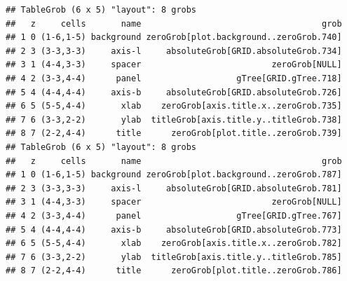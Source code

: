\documentclass[a4paper,landscape]{article}\usepackage[]{graphicx}\usepackage[]{color}
\makeatletter
\newenvironment{kframe}{%
 \def\at@end@of@kframe{}%
 \ifinner\ifhmode%
  \def\at@end@of@kframe{\end{minipage}}%
  \begin{minipage}{\columnwidth}%
 \fi\fi%
 \def\FrameCommand##1{\hskip\@totalleftmargin \hskip-\fboxsep
 \colorbox{shadecolor}{##1}\hskip-\fboxsep
     \hskip-\linewidth \hskip-\@totalleftmargin \hskip\columnwidth}%
 \MakeFramed {\advance\hsize-\width
   \@totalleftmargin\z@ \linewidth\hsize
   \@setminipage}}%
 {\par\unskip\endMakeFramed%
 \at@end@of@kframe}
\newenvironment{knitrout}{}{} %
\makeatother
\begin{document}
\begin{knitrout}
\color{fgcolor}\begin{kframe}
\begin{verbatim}
## TableGrob (6 x 5) "layout": 8 grobs
##   z     cells       name                                    grob
## 1 0 (1-6,1-5) background zeroGrob[plot.background..zeroGrob.740]
## 2 3 (3-3,3-3)     axis-l     absoluteGrob[GRID.absoluteGrob.734]
## 3 1 (4-4,3-3)     spacer                          zeroGrob[NULL]
## 4 2 (3-3,4-4)      panel                   gTree[GRID.gTree.718]
## 5 4 (4-4,4-4)     axis-b     absoluteGrob[GRID.absoluteGrob.726]
## 6 5 (5-5,4-4)       xlab    zeroGrob[axis.title.x..zeroGrob.735]
## 7 6 (3-3,2-2)       ylab  titleGrob[axis.title.y..titleGrob.738]
## 8 7 (2-2,4-4)      title      zeroGrob[plot.title..zeroGrob.739]
## TableGrob (6 x 5) "layout": 8 grobs
##   z     cells       name                                    grob
## 1 0 (1-6,1-5) background zeroGrob[plot.background..zeroGrob.787]
## 2 3 (3-3,3-3)     axis-l     absoluteGrob[GRID.absoluteGrob.781]
## 3 1 (4-4,3-3)     spacer                          zeroGrob[NULL]
## 4 2 (3-3,4-4)      panel                   gTree[GRID.gTree.767]
## 5 4 (4-4,4-4)     axis-b     absoluteGrob[GRID.absoluteGrob.773]
## 6 5 (5-5,4-4)       xlab    zeroGrob[axis.title.x..zeroGrob.782]
## 7 6 (3-3,2-2)       ylab  titleGrob[axis.title.y..titleGrob.785]
## 8 7 (2-2,4-4)      title      zeroGrob[plot.title..zeroGrob.786]
\end{verbatim}
\end{kframe}
\end{knitrout}

\phantom{.}
\end{document}
